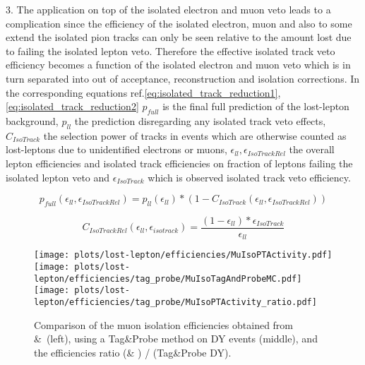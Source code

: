  3. The application on top of the isolated electron and muon veto leads to a complication since the efficiency of the isolated electron, muon and also to some extend the isolated pion tracks can only be seen relative to the amount lost due to failing the isolated lepton veto. Therefore the effective isolated track veto efficiency becomes a function of the isolated electron and muon veto which is in turn separated into out of acceptance, reconstruction and isolation corrections. 
In the corresponding equations ref.\ref{eq:isolated_track_reduction1}, \ref{eq:isolated_track_reduction2} $p_{full}$ is the final full prediction of the lost-lepton background, $p_{ll}$ the prediction disregarding any isolated track veto effects, $C_{IsoTrack}$ the selection power of tracks in events which are otherwise counted as lost-leptons due to unidentified electrons or muons, $\epsilon_{ll},\epsilon_{IsoTrackRel}$ the overall lepton efficiencies and isolated track efficiencies on fraction of leptons failing the isolated lepton veto and $\epsilon_{IsoTrack}$ which is observed isolated track veto efficiency.

 

\begin{equation}
 p_{full}(\epsilon_{ll},\epsilon_{IsoTrackRel}) = p_{ll}(\epsilon_{ll}) * (1-C_{IsoTrack}(\epsilon_{ll},\epsilon_{IsoTrackRel}))
  \label{eq:isolated_track_reduction1}
\end{equation}

\begin{equation}
  C_{IsoTrackRel}(\epsilon_{ll},\epsilon_{isotrack}) = \frac{(1-\epsilon_{ll}) * \epsilon_{IsoTrack}}{\epsilon_{ll}}
  \label{eq:isolated_track_reduction2}
\end{equation}



\begin{figure}[h]
  \centering
  \texttt{[image: plots/lost-lepton/efficiencies/MuIsoPTActivity.pdf]}
  \texttt{[image: plots/lost-lepton/efficiencies/tag\_probe/MuIsoTagAndProbeMC.pdf]}\\
  \texttt{[image: plots/lost-lepton/efficiencies/tag\_probe/MuIsoPTActivity\_ratio.pdf]}
  \caption{Comparison of the muon isolation efficiencies obtained from \ttbar &\ \wpj (left), using a Tag\&Probe method on DY events (middle), and the efficiencies ratio (\ttbar \& \wpj) / (Tag\&Probe DY). }
  \label{fig:lost-lepton-tag_probe-mu-iso}
\end{figure}



